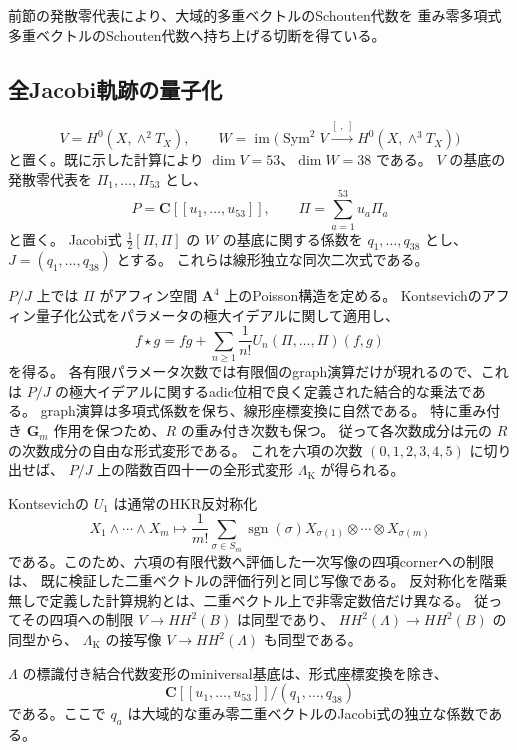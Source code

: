 前節の発散零代表により、大域的多重ベクトルのSchouten代数を
重み零多項式多重ベクトルのSchouten代数へ持ち上げる切断を得ている。

\subsection{全Jacobi軌跡の量子化}

\[
 V=H^0(X,\wedge^2T_X),\qquad
 W=\operatorname{im}\bigl(\operatorname{Sym}^2V
       \xrightarrow{[\ ,\ ]}H^0(X,\wedge^3T_X)\bigr)
\]
と置く。既に示した計算により $\dim V=53$、$\dim W=38$ である。
$V$ の基底の発散零代表を $\Pi_1,\ldots,\Pi_{53}$ とし、
\[
 P=\mathbf C[[u_1,\ldots,u_{53}]],\qquad
 \Pi=\sum_{a=1}^{53}u_a\Pi_a
\]
と置く。
Jacobi式 $\frac12[\Pi,\Pi]$ の $W$ の基底に関する係数を
$q_1,\ldots,q_{38}$ とし、$J=(q_1,\ldots,q_{38})$ とする。
これらは線形独立な同次二次式である。

$P/J$ 上では $\Pi$ がアフィン空間 $\mathbf A^4$ 上のPoisson構造を定める。
Kontsevichのアフィン量子化公式\cite[\S6.3--6.4]{Kontsevich}をパラメータの極大イデアルに関して適用し、
\[
 f\star g=fg+\sum_{n\ge1}\frac1{n!}U_n(\Pi,\ldots,\Pi)(f,g)
\]
を得る。
各有限パラメータ次数では有限個のgraph演算だけが現れるので、これは
$P/J$ の極大イデアルに関するadic位相で良く定義された結合的な乗法である。
graph演算は多項式係数を保ち、線形座標変換に自然である。
特に重み付き $\mathbf G_m$ 作用を保つため、$R$ の重み付き次数も保つ。
従って各次数成分は元の $R$ の次数成分の自由な形式変形である。
これを六項の次数 $(0,1,2,3,4,5)$ に切り出せば、
$P/J$ 上の階数百四十一の全形式変形 $\Lambda_{\mathrm{K}}$ が得られる。

Kontsevichの $U_1$ は通常のHKR反対称化
\[
 X_1\wedge\cdots\wedge X_m
 \longmapsto\frac1{m!}\sum_{\sigma\in S_m}
       \operatorname{sgn}(\sigma)X_{\sigma(1)}\otimes\cdots\otimes X_{\sigma(m)}
\]
である。このため、六項の有限代数へ評価した一次写像の四項cornerへの制限は、
既に検証した二重ベクトルの評価行列と同じ写像である。
反対称化を階乗無しで定義した計算規約とは、二重ベクトル上で非零定数倍だけ異なる。
従ってその四項への制限 $V\to HH^2(B)$ は同型であり、
$HH^2(\Lambda)\to HH^2(B)$ の同型から、
$\Lambda_{\mathrm K}$ の接写像 $V\to HH^2(\Lambda)$ も同型である。

\begin{theorem}[周囲のminiversal基底の二次表示]
\label{thm:ambient-quadratic-hull-v31}
$\Lambda$ の標識付き結合代数変形のminiversal基底は、形式座標変換を除き、
\[
 \mathbf C[[u_1,\ldots,u_{53}]]/(q_1,\ldots,q_{38})
\]
である。ここで $q_a$ は大域的な重み零二重ベクトルのJacobi式の独立な係数である。
\end{theorem}

